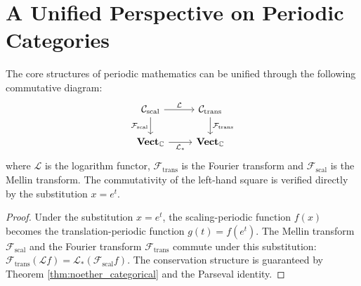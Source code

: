 \section{A Unified Perspective on Periodic Categories}\label{sec:periodic_category_unification}

\begin{theorem}\label{thm:periodic_category_unification}
The core structures of periodic mathematics can be unified through the following commutative diagram:
\[
\begin{tikzcd}
\mathcal{C}_{\text{scal}} \arrow[r, "\mathcal{L}"] \arrow[d, "\mathcal{F}_{\text{scal}}"'] & \mathcal{C}_{\text{trans}} \arrow[d, "\mathcal{F}_{\text{trans}}"] \\
\mathbf{Vect}_{\mathbb{C}} \arrow[r, "\mathcal{L}_*"'] & \mathbf{Vect}_{\mathbb{C}}
\end{tikzcd}
\]
where $\mathcal{L}$ is the logarithm functor, $\mathcal{F}_{\text{trans}}$ is the Fourier transform and $\mathcal{F}_{\text{scal}}$ is the Mellin transform. The commutativity of the left-hand square is verified directly by the substitution $x = e^t$.
\end{theorem}

\begin{proof}
Under the substitution $x = e^t$, the scaling-periodic function $f(x)$ becomes the translation-periodic function $g(t) = f(e^t)$. The Mellin transform $\mathcal{F}_{\text{scal}}$ and the Fourier transform $\mathcal{F}_{\text{trans}}$ commute under this substitution: $\mathcal{F}_{\text{trans}}(\mathcal{L}f) = \mathcal{L}_*(\mathcal{F}_{\text{scal}}f)$. The conservation structure is guaranteed by Theorem \ref{thm:noether_categorical} and the Parseval identity.
\end{proof}

